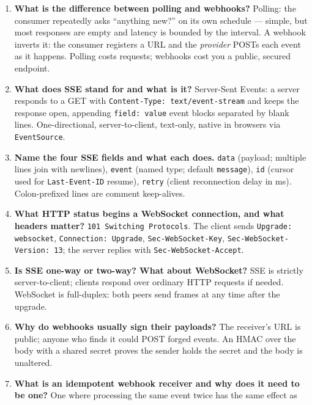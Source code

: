 \begin{enumerate}[label=\textbf{Q\arabic*.}, leftmargin=1.6cm]
  \item \textbf{What is the difference between polling and webhooks?}
        Polling: the consumer repeatedly asks ``anything new?'' on its own
        schedule --- simple, but most responses are empty and latency is
        bounded by the interval. A webhook inverts it: the consumer registers
        a URL and the \emph{provider} POSTs each event as it happens.
        Polling costs requests; webhooks cost you a public, secured endpoint.
  \item \textbf{What does SSE stand for and what is it?}
        Server-Sent Events: a server responds to a GET with
        \texttt{Content-Type: text/event-stream} and keeps the response open,
        appending \texttt{field: value} event blocks separated by blank
        lines. One-directional, server-to-client, text-only, native in
        browsers via \texttt{EventSource}.
  \item \textbf{Name the four SSE fields and what each does.}
        \texttt{data} (payload; multiple lines join with newlines),
        \texttt{event} (named type; default \texttt{message}),
        \texttt{id} (cursor used for \texttt{Last-Event-ID} resume),
        \texttt{retry} (client reconnection delay in ms). Colon-prefixed
        lines are comment keep-alives.
  \item \textbf{What HTTP status begins a WebSocket connection, and what
        headers matter?}
        \texttt{101 Switching Protocols}. The client sends
        \texttt{Upgrade: websocket}, \texttt{Connection: Upgrade},
        \texttt{Sec-WebSocket-Key}, \texttt{Sec-WebSocket-Version: 13}; the
        server replies with \texttt{Sec-WebSocket-Accept}.
  \item \textbf{Is SSE one-way or two-way? What about WebSocket?}
        SSE is strictly server-to-client; clients respond over ordinary HTTP
        requests if needed. WebSocket is full-duplex: both peers send frames
        at any time after the upgrade.
  \item \textbf{Why do webhooks usually sign their payloads?}
        The receiver's URL is public; anyone who finds it could POST forged
        events. An HMAC over the body with a shared secret proves the sender
        holds the secret and the body is unaltered.
  \item \textbf{What is an idempotent webhook receiver and why does it need
        to be one?}
        One where processing the same event twice has the same effect as

\end{enumerate}
